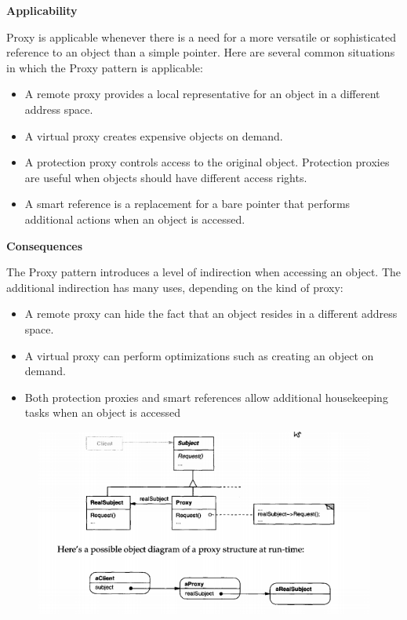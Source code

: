 \documentclass{article}
\begin{document}
\textbf{Applicability}

Proxy is applicable whenever there is a need for a more versatile or sophisticated reference to an object than a simple pointer. Here are several common situations in which the Proxy pattern is applicable:
\begin{itemize}
    \item A remote proxy provides a local representative for an object in a different address space.
    \item A virtual proxy creates expensive objects on demand.
    \item A protection proxy controls access to the original object. Protection proxies are useful when objects should have different access rights.
    \item A smart reference is a replacement for a bare pointer that performs additional actions when an object is accessed.
\end{itemize}

\textbf{Consequences}

The Proxy pattern introduces a level of indirection when accessing an object. The additional indirection has many uses, depending on the kind of proxy:
\begin{itemize}
    \item A remote proxy can hide the fact that an object resides in a different address space.
    \item A virtual proxy can perform optimizations such as creating an object on demand.
    \item Both protection proxies and smart references allow additional housekeeping tasks when an object is accessed
\end{itemize}

\begin{figure}[h]
    \centering
    \includegraphics[width=14cm]{diagrams/pattern-12-proxy.png}
\end{figure}
\end{document}
